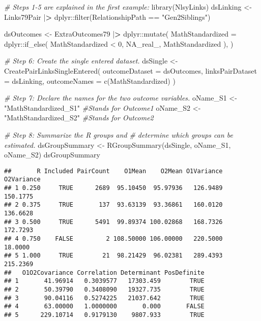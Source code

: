 \documentclass[smallextended]{svjour3}       %
\newenvironment{Shaded}{\begin{snugshade}}{\end{snugshade}}
\newcommand{\AttributeTok}[1]{\textcolor[rgb]{0.77,0.63,0.00}{#1}}
\newcommand{\CommentTok}[1]{\textcolor[rgb]{0.56,0.35,0.01}{\textit{#1}}}
\newcommand{\ConstantTok}[1]{\textcolor[rgb]{0.00,0.00,0.00}{#1}}
\newcommand{\DecValTok}[1]{\textcolor[rgb]{0.00,0.00,0.81}{#1}}
\newcommand{\ErrorTok}[1]{\textcolor[rgb]{0.64,0.00,0.00}{\textbf{#1}}}
\newcommand{\FunctionTok}[1]{\textcolor[rgb]{0.00,0.00,0.00}{#1}}
\newcommand{\NormalTok}[1]{#1}
\newcommand{\OtherTok}[1]{\textcolor[rgb]{0.56,0.35,0.01}{#1}}
\newcommand{\SpecialCharTok}[1]{\textcolor[rgb]{0.00,0.00,0.00}{#1}}
\newcommand{\StringTok}[1]{\textcolor[rgb]{0.31,0.60,0.02}{#1}}
\begin{document}
\begin{Shaded}
\begin{Highlighting}[]
\CommentTok{\# Steps 1{-}5 are explained in the first example:}
\FunctionTok{library}\NormalTok{(NlsyLinks)}
\NormalTok{dsLinking }\OtherTok{\textless{}{-}} 
\NormalTok{  Links79Pair }\SpecialCharTok{|}\ErrorTok{\textgreater{}} 
\NormalTok{  dplyr}\SpecialCharTok{::}\FunctionTok{filter}\NormalTok{(RelationshipPath }\SpecialCharTok{==} \StringTok{"Gen2Siblings"}\NormalTok{)}

\NormalTok{dsOutcomes }\OtherTok{\textless{}{-}} 
\NormalTok{  ExtraOutcomes79 }\SpecialCharTok{|}\ErrorTok{\textgreater{}} 
\NormalTok{  dplyr}\SpecialCharTok{::}\FunctionTok{mutate}\NormalTok{(}
    \AttributeTok{MathStandardized =}\NormalTok{ dplyr}\SpecialCharTok{::}\FunctionTok{if\_else}\NormalTok{(}
\NormalTok{      MathStandardized }\SpecialCharTok{\textless{}} \DecValTok{0}\NormalTok{,}
      \ConstantTok{NA\_real\_}\NormalTok{,}
\NormalTok{      MathStandardized}
\NormalTok{    ),}
\NormalTok{  )}

\CommentTok{\# Step 6: Create the single entered dataset.}
\NormalTok{dsSingle }\OtherTok{\textless{}{-}} 
  \FunctionTok{CreatePairLinksSingleEntered}\NormalTok{(}
    \AttributeTok{outcomeDataset   =}\NormalTok{ dsOutcomes,}
    \AttributeTok{linksPairDataset =}\NormalTok{ dsLinking,}
    \AttributeTok{outcomeNames     =} \FunctionTok{c}\NormalTok{(}\StringTok{\textquotesingle{}MathStandardized\textquotesingle{}}\NormalTok{)}
\NormalTok{  )}

\CommentTok{\# Step 7: Declare the names for the two outcome variables.}
\NormalTok{oName\_S1 }\OtherTok{\textless{}{-}} \StringTok{"MathStandardized\_S1"} \CommentTok{\#Stands for Outcome1}
\NormalTok{oName\_S2 }\OtherTok{\textless{}{-}} \StringTok{"MathStandardized\_S2"} \CommentTok{\#Stands for Outcome2}

\CommentTok{\# Step 8: Summarize the R groups and }
\CommentTok{\#   determine which groups can be estimated.}
\NormalTok{dsGroupSummary }\OtherTok{\textless{}{-}} \FunctionTok{RGroupSummary}\NormalTok{(dsSingle, oName\_S1, oName\_S2)}
\NormalTok{dsGroupSummary}
\end{Highlighting}
\end{Shaded}

\begin{verbatim}
##       R Included PairCount    O1Mean    O2Mean O1Variance O2Variance
## 1 0.250     TRUE      2689  95.10450  95.97936   126.9489   150.1775
## 2 0.375     TRUE       137  93.63139  93.36861   160.0120   136.6628
## 3 0.500     TRUE      5491  99.89374 100.02868   168.7326   172.7293
## 4 0.750    FALSE         2 108.50000 106.00000   220.5000    18.0000
## 5 1.000     TRUE        21  98.21429  96.02381   289.4393   215.2369
##   O1O2Covariance Correlation Determinant PosDefinite
## 1       41.96914   0.3039577   17303.459        TRUE
## 2       50.39790   0.3408090   19327.735        TRUE
## 3       90.04116   0.5274225   21037.642        TRUE
## 4       63.00000   1.0000000       0.000       FALSE
## 5      229.10714   0.9179130    9807.933        TRUE
\end{verbatim}
\end{document}

